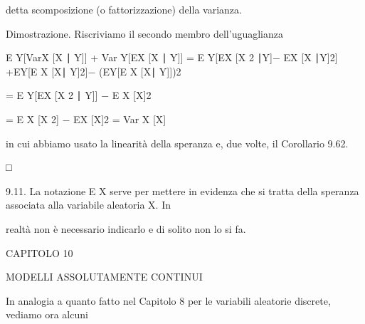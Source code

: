\documentclass[a4paper,portrait,12pt]{article}
\begin{document}
\begin{flushleft}
detta scomposizione (o fattorizzazione) della varianza.
\end{flushleft}


\begin{flushleft}
Dimostrazione. Riscriviamo il secondo membro dell'uguaglianza
\end{flushleft}


\begin{flushleft}
E Y[VarX [X ∣ Y]] + Var Y[EX [X ∣ Y]] = E Y[EX [X 2 ∣Y]$-$ EX [X ∣Y]2] +EY[E X [X∣ Y]2]$-$ (EY[E X [X∣ Y]])2
\end{flushleft}


\begin{flushleft}
= E Y[EX [X 2 ∣ Y]] $-$ E X [X]2
\end{flushleft}


\begin{flushleft}
= E X [X 2] $-$ EX [X]2 = Var X [X]
\end{flushleft}


\begin{flushleft}
in cui abbiamo usato la linearit\`{a} della speranza e, due volte, il Corollario 9.62.
\end{flushleft}





□





\begin{flushleft}
9.11. La notazione E X serve per mettere in evidenza che si tratta della speranza associata alla variabile aleatoria X. In
\end{flushleft}


\begin{flushleft}
realt\`{a} non \`{e} necessario indicarlo e di solito non lo si fa.
\end{flushleft}





\begin{flushleft}
\newpage
\newpage
CAPITOLO 10
\end{flushleft}


\begin{flushleft}
MODELLI ASSOLUTAMENTE CONTINUI
\end{flushleft}


\begin{flushleft}
In analogia a quanto fatto nel Capitolo 8 per le variabili aleatorie discrete, vediamo ora alcuni
\end{flushleft}
\end{document}
